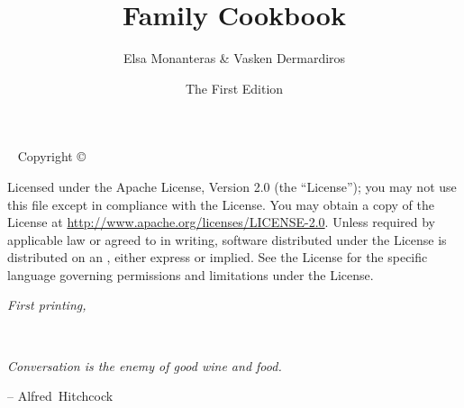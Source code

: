 

\title{Family Cookbook}
\date{The First Edition}
\author{Elsa \mbox{Monanteras} \& Vasken \mbox{Dermardiros}}




\frontmatter


\maketitle

\newpage
\begin{fullwidth}
~\vfill
\thispagestyle{empty}
\setlength{\parindent}{0pt}
\setlength{\parskip}{\baselineskip}
Copyright \copyright\ \the\year\ \thanklessauthor

\par{}


\par Licensed under the Apache License, Version 2.0 (the ``License''); you may not
use this file except in compliance with the License. You may obtain a copy
of the License at \url{http://www.apache.org/licenses/LICENSE-2.0}. Unless
required by applicable law or agreed to in writing, software distributed
under the License is distributed on an , either express or implied. See the
License for the specific language governing permissions and limitations
under the License.

\par\textit{First printing, \monthyear}
\end{fullwidth}

\tableofcontents



\newpage
~\vfill
\begin{doublespace}
\noindent\fontsize{18}{22}\selectfont\itshape
\nohyphenation
Conversation is the enemy of good wine and food.
\vspace{-24pt}
\begin{flushright}
 -- \mbox{Alfred~Hitchcock}
\end{flushright}
\end{doublespace}
\vfill
\vfill


